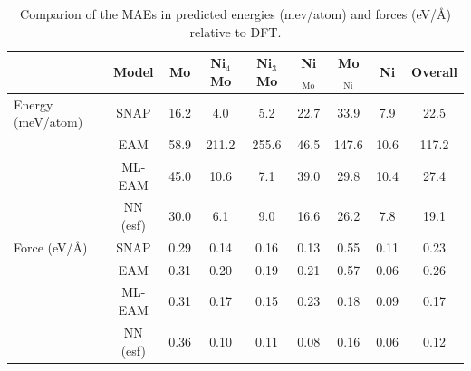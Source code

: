\documentclass[prb,reprint]{revtex4-2}
\begin{document}
\begin{table}[h]
\centering
\begin{tabular}{lcccccccc}
\hline
    & Model & Mo & Ni$_4$Mo & Ni$_3$Mo & Ni$_{\mathrm{Mo}}$ & Mo$_{\mathrm{Ni}}$ 
    & Ni & Overall \\
\hline
Energy (meV/atom) & SNAP & 16.2 & 4.0 & 5.2 & 22.7 & 33.9 & 7.9 & 22.5 \\
    & EAM & 58.9 & 211.2 & 255.6 & 46.5 & 147.6 & 10.6 & 117.2 \\
    & \color{red} ML-EAM & \color{red} 45.0 & \color{red} 10.6 
    & \color{red} 7.1 & \color{red} 39.0 & \color{red} 29.8 & \color{red} 10.4 
    & \color{red} 27.4 \\
    & NN (esf) & 30.0 & 6.1 & 9.0 & 16.6 & 26.2 & 7.8 & 19.1 \\
\hline
Force (eV/\AA) & SNAP & 0.29 & 0.14 & 0.16 & 0.13 & 0.55 & 0.11 & 0.23 \\
& EAM & 0.31 & 0.20 & 0.19 & 0.21 & 0.57 & 0.06 & 0.26 \\
& \color{red} ML-EAM & \color{red} 0.31 & \color{red} 0.17 & \color{red} 0.15 
& \color{red} 0.23 & \color{red} 0.18 & \color{red} 0.09 & \color{red} 0.17 \\
& NN (esf) & 0.36 & 0.10 & 0.11 & 0.08 & 0.16 & 0.06 & 0.12 \\
\hline
\end{tabular}
\caption{\label{table:MAE}
Comparion of the MAEs in predicted energies (mev/atom) and forces (eV/\AA) 
relative to DFT.}
\end{table}
\end{document}
